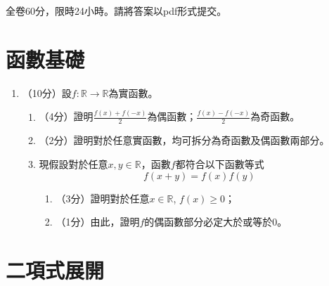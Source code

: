 \documentclass[12pt]{article}
\begin{document}
    全卷60分，限時24小時。請將答案以pdf形式提交。
    \section*{函數基礎}

    \begin{enumerate}
        \item （10分）設$f:\mathbb{R}\to\mathbb{R}$為實函數。\begin{enumerate}
            \item （4分）證明$\frac{f(x)+f(-x)}{2}$為偶函數；$\frac{f(x)-f(-x)}{2}$為奇函數。
            \item （2分）證明對於任意實函數，均可拆分為奇函數及偶函數兩部分。
            \item 現假設對於任意$x,y\in\mathbb{R}$，函數$f$都符合以下函數等式$$f(x+y)=f(x)f(y)$$\begin{enumerate}
                \item （3分）證明對於任意$x\in\mathbb{R}$, $f(x)\geq 0$；
                \item （1分）由此，證明$f$的偶函數部分必定大於或等於$0$。
            \end{enumerate}
        \end{enumerate}
    \end{enumerate}

    

    \section*{二項式展開}
\end{document}
